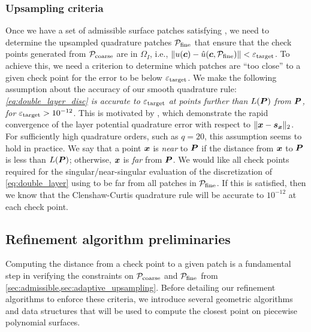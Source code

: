 \subsubsection{Upsampling criteria\label{sec:adaptive_upsampling}}
Once we have a set of admissible surface patches satisfying , we need to determine the upsampled quadrature patches ${\mathcal{P}_{\mathrm{fine}}}$ that ensure that the check points generated from ${\mathcal{P}_{\mathrm{coarse}}}$ are in $\Omega_I$, i.e., $\|u({\bm{c}}) - \hat{u}({\bm{c}}, {\mathcal{P}_{\mathrm{fine}}})\| < {\varepsilon_{\mathrm{target}}}$.
To achieve this, we need a criterion to determine which patches are ``too close'' to a given check point for the error to be below ${\varepsilon_{\mathrm{target}}}$.
We make the following assumption about the accuracy of our smooth quadrature rule: \textit{\cref{eq:double_layer_disc} is accurate to ${\varepsilon_{\mathrm{target}}}$ at points further than  $L({\bm{P}})$ from ${\bm{P}}$, for ${\varepsilon_{\mathrm{target}}} > 10^{-12}$}.
This is motivated by \cite{aT2,barnett2014evaluation}, which demonstrate the rapid convergence of the layer potential quadrature error with respect to $\|{\bm{x}} - {\bm{s}_{\bm{x}}}\|_2$.  
For sufficiently high quadrature orders, such as $q=20$, this assumption seems to hold in practice.
We say that a point ${\bm{x}}$ is \textit{near} to ${\bm{P}}$ if the distance from ${\bm{x}}$ to ${\bm{P}}$ is less than $L({\bm{P}})$; otherwise, ${\bm{x}}$ is \textit{far} from ${\bm{P}}$.
We would like all check points required for the singular/near-singular evaluation of the discretization of \cref{eq:double_layer} using \qbkix to be far from all patches in ${\mathcal{P}_{\mathrm{fine}}}$.
If this is satisfied, then we know that the Clenshaw-Curtis quadrature rule will be accurate to $10^{-12}$ at each check point.

\subsection{Refinement algorithm preliminaries}
Computing the distance from a check point to a given patch is a fundamental step in verifying the constraints on ${\mathcal{P}_{\mathrm{coarse}}}$ and ${\mathcal{P}_{\mathrm{fine}}}$ from \cref{sec:admissible,sec:adaptive_upsampling}. 
Before detailing our refinement algorithms to enforce these criteria, we introduce several geometric algorithms and data structures that will be used to compute the closest point on piecewise polynomial surfaces.

